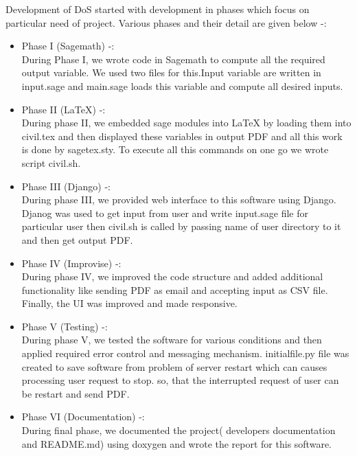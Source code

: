 Development of DoS started with development in phases which focus on particular need of project.
Various phases and their detail are given below -:
\begin{itemize}
\item Phase I (Sagemath) -: \\
	During Phase I, we wrote code in Sagemath to compute all the required output variable.
We used two files for this.Input variable are written in input.sage and main.sage loads this variable and 
compute all desired inputs.
\item Phase II (\LaTeX{}) -: \\
	During phase II, we embedded sage modules into \LaTeX{} by loading them into civil.tex and then displayed these
	variables in output PDF and all this work is done by sagetex.sty. To execute all this commands on one go 
	we wrote script civil.sh.
\item Phase III (Django) -: \\
	During phase III, we provided web interface to this software using Django. Djanog was used
	to get input from user and write input.sage file for particular user then civil.sh 
	is called by passing name of user directory to it and then get output PDF.
\item Phase IV (Improvise) -: \\
	During phase IV, we improved the code structure and added additional 
	functionality like sending PDF as email and accepting input as CSV file.
	Finally, the UI was improved and made responsive.
\item Phase V (Testing) -: \\
During phase V, we tested the software for various conditions and then applied required error control and messaging 
mechanism. initialfile.py file was created to save software from problem of server restart which can causes processing user request to stop. so, that 
the interrupted request of user can be restart and send PDF.
\item Phase VI (Documentation) -: \\ 
During final phase, we documented the project( developers documentation and README.md) using doxygen and wrote the report for this software.    
\end{itemize}     

